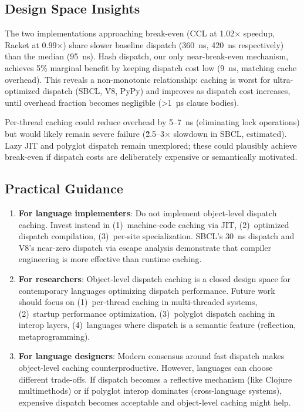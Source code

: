 \documentclass[sigplan,final,acmsmall,review,screen]{acmart}
\begin{document}
\subsection{Design Space Insights}

The two implementations approaching break-even (CCL at 1.02× speedup, Racket at 0.99×) share slower baseline dispatch (360~ns, 420~ns
respectively) than the median (95~ns). Hash dispatch, our only near-break-even mechanism, achieves 5\% marginal benefit by keeping dispatch cost
low (9~ns, matching cache overhead). This reveals a non-monotonic relationship: caching is worst for ultra-optimized dispatch
(SBCL, V8, PyPy) and improves as dispatch cost increases, until overhead fraction becomes negligible (>1~µs clause bodies).

Per-thread caching could reduce overhead by 5--7~ns (eliminating lock operations) but would likely remain severe failure
(\~2.5--3× slowdown in SBCL, estimated). Lazy JIT and polyglot dispatch remain unexplored; these could plausibly achieve break-even
if dispatch costs are deliberately expensive or semantically motivated.

\subsection{Practical Guidance}

\begin{enumerate}
  \item \textbf{For language implementers}: Do not implement object-level dispatch caching. Invest instead in (1)~machine-code caching
    via JIT, (2)~optimized dispatch compilation, (3)~per-site specialization. SBCL's 30~ns dispatch and V8's near-zero dispatch via
    escape analysis demonstrate that compiler engineering is more effective than runtime caching.

  \item \textbf{For researchers}: Object-level dispatch caching is a closed design space for contemporary languages optimizing dispatch performance.
    Future work should focus on (1)~per-thread caching in multi-threaded systems, (2)~startup performance optimization, (3)~polyglot dispatch
    caching in interop layers, (4)~languages where dispatch is a semantic feature (reflection, metaprogramming).

  \item \textbf{For language designers}: Modern consensus around fast dispatch makes object-level caching counterproductive.
    However, languages can choose different trade-offs. If dispatch becomes a reflective mechanism (like Clojure multimethods) or
    if polyglot interop dominates (cross-language systems), expensive dispatch becomes acceptable and object-level caching might help.
\end{enumerate}
\end{document}
